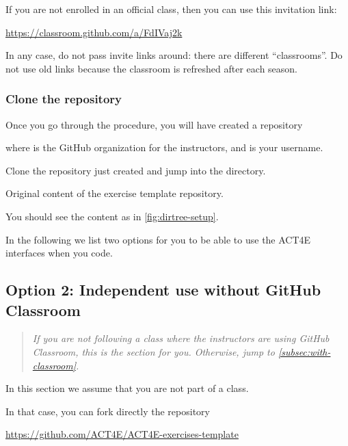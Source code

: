 If you are not enrolled in an official class, then you can use this invitation link:

\url{https://classroom.github.com/a/FdIVaj2k}


In any case, do not pass invite links around: there are different ``classrooms''.
Do not use old links because the classroom is refreshed after each season.

\subsubsection{Clone the repository}

Once you go through the procedure, you will have created a repository

\begin{quote}
\end{quote}
where  is the GitHub organization for the instructors, and  is your username.

Clone the repository just created and jump into the directory.

\begin{marginfigure}
    \caption{Original content of the exercise template repository.}
    \label{fig:dirtree-setup}
\end{marginfigure}

You should see the content as in \cref{fig:dirtree-setup}.

In the following we list two options for you to be able to use the ACT4E interfaces when you code.

\subsection{Option 2: Independent use without GitHub Classroom}
\label{subsec:without-classroom}

\begin{quote}
    \emph{
        If you are \emph{not} following a class where the instructors are using GitHub Classroom,
        this is the section for you.
        Otherwise, jump to \cref{subsec:with-classroom}.
    }
\end{quote}

In this section we assume that you are not part of a class.

In that case, you can fork directly the repository

\url{https://github.com/ACT4E/ACT4E-exercises-template}

